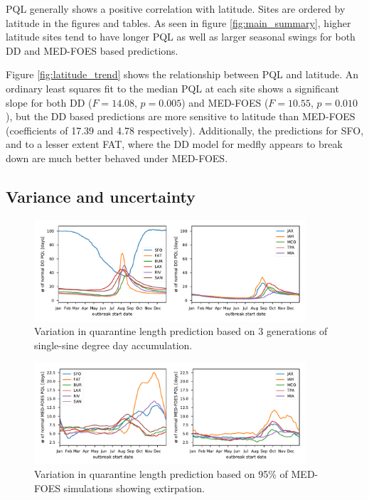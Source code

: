 \documentclass[10pt,a4paper,twocolumn]{article}
\begin{document}
PQL generally shows a positive correlation with latitude\cite{??}.
Sites are ordered by latitude in the figures and tables.
As seen in figure \ref{fig:main_summary}, higher latitude sites tend to have longer PQL 
as well as larger seasonal swings for both DD and MED-FOES based predictions.

Figure \ref{fig:latitude_trend} shows the relationship between PQL and latitude.
An ordinary least squares fit to the median PQL at each site shows a significant slope for
both DD ($F{=}14.08$, $p{=}0.005$) and MED-FOES ($F{=}10.55$, $p{=}0.010$), but
the DD based predictions are more sensitive to latitude than MED-FOES
(coefficients of 17.39 and 4.78 respectively).
Additionally, the predictions for SFO, and to a lesser extent FAT, where the DD model for medfly appears to
break down are much better behaved under MED-FOES.

\subsection*{Variance and uncertainty}

\begin{figure}[ht!]
\centering
\includegraphics[width=0.9\textwidth]{figs/fig_BMDD_variation.pdf}
\caption{\label{fig:DD_variation_summary}Variation in quarantine length prediction 
based on 3 generations of single-sine degree day accumulation.}
\end{figure}

\begin{figure}[ht!]
\centering
\includegraphics[width=0.9\textwidth]{figs/fig_pe95_variation.pdf}
\caption{\label{fig:pe95_variation_summary}Variation in quarantine length prediction 
based on 95\% of MED-FOES simulations showing extirpation.}
\end{figure}
\end{document}
